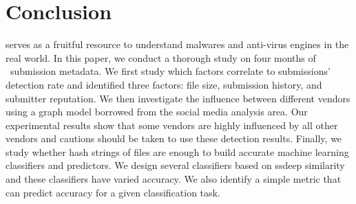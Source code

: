 \section{Conclusion}
\label{sec:con}

\vt{} serves as a fruitful resource to understand malwares and anti-virus engines in the real world. 
In this paper, 
we conduct a thorough study on four months of \vt\ submission metadata.
We first study which factors correlate to submissions' detection rate 
and identified three factors: file size, submission history, and submitter reputation.
We then investigate the influence between different vendors using a graph model borrowed from the social media analysis area. 
Our experimental results show that   
some vendors are highly influenced by all other vendors
and cautions should be taken to use these detection results.
Finally, we study whether hash strings of files are enough to build accurate machine learning classifiers and predictors. 
We design several classifiers based on ssdeep similarity and these classifiers have varied accuracy. 
We also identify a simple metric that can predict accuracy for a given classification
task.

